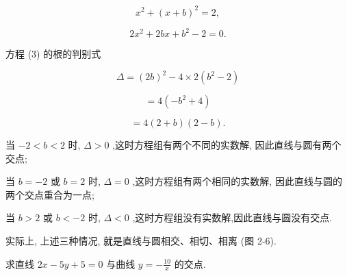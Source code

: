 \documentclass[lang=cn,newtx,10.5pt,scheme=chinese]{elegantbook}
\begin{document}
\[
    {x}^{2} + {\left( x + b\right) }^{2} = 2,
\]

\[
  2{x}^{2} + {2bx} + {b}^{2} - 2 = 0. \tag{3}
\]

方程 (3) 的根的判别式

\[
  \Delta = {\left( 2b\right) }^{2} - 4 \times 2\left( {{b}^{2} - 2}\right)
\]

\[
  = 4\left( {-{b}^{2} + 4}\right)
\]

\[
  = 4\left( {2 + b}\right) \left( {2 - b}\right) \text{.}
\]

当 \(- 2 < b < 2\) 时, \(\Delta > 0\) ,这时方程组有两个不同的实数解, 因此直线与圆有两个交点;

当 \(b = - 2\) 或 \(b = 2\) 时, \(\Delta = 0\) ,这时方程组有两个相同的实数解, 因此直线与圆的两个交点重合为一点;

当 \(b > 2\) 或 \(b < - 2\) 时, \(\Delta < 0\) ,这时方程组没有实数解,因此直线与圆没有交点.

实际上, 上述三种情况, 就是直线与圆相交、相切、相离 (图 2-6).

\begin{problemset}[练习]

\item 求直线 \({2x} - {5y} + 5 = 0\) 与曲线 \(y = - \frac{10}{x}\) 的交点.
\end{problemset}
\end{document}
